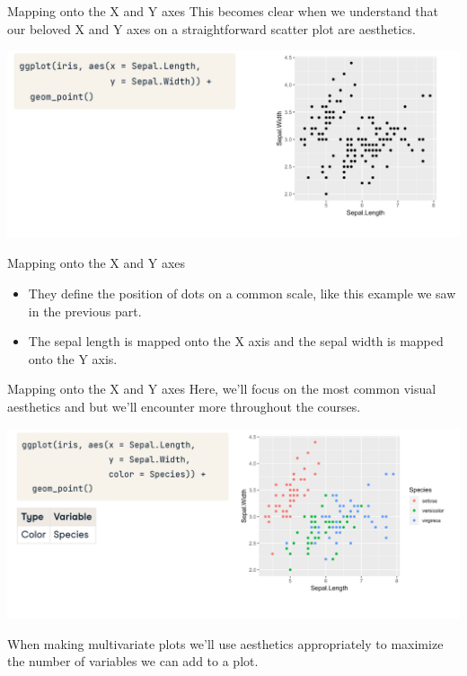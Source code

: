\documentclass[
  ignorenonframetext,
]{beamer}
\begin{document}
\begin{frame}{Mapping onto the X and Y axes}
\label{mapping-onto-the-x-and-y-axes-1}
This becomes clear when we understand that our beloved X and Y axes on a
straightforward scatter plot are aesthetics.

\includegraphics{../images/im135.png}
\end{frame}

\begin{frame}{Mapping onto the X and Y axes}
\label{mapping-onto-the-x-and-y-axes-2}
\begin{itemize}
\item
  They define the position of dots on a common scale, like this example
  we saw in the previous part.
\item
  The sepal length is mapped onto the X axis and the sepal width is
  mapped onto the Y axis.
\end{itemize}
\end{frame}

\begin{frame}{Mapping onto the X and Y axes}
\label{mapping-onto-the-x-and-y-axes-3}
Here, we'll focus on the most common visual aesthetics and but we'll
encounter more throughout the courses.

\includegraphics{../images/im136.png}

When making multivariate plots we'll use aesthetics appropriately to
maximize the number of variables we can add to a plot.
\end{frame}
\end{document}
